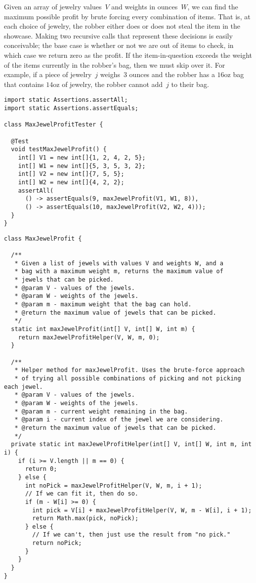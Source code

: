 Given an array of jewelry values~$V$ and weights in ounces~$W$, we can find the maximum possible profit by brute forcing every combination of items. 
That is, at each choice of jewelry, the robber either does or does not steal the item in the showcase. 
Making two recursive calls that represent these decisions is easily conceivable; 
the base case is whether or not we are out of items to check, in which case we return zero as the profit. 
If the item-in-question exceeds the weight of the items currently in the robber's bag, then we must skip over it. 
For example, if a piece of jewelry~$j$ weighs~$3$ ounces and the robber has a $16\text{oz}$ bag that contains $14\text{oz}$ of jewelry, the robber cannot add~$j$ to their bag.

\begin{lstlisting}[language=MyJava]
import static Assertions.assertAll;
import static Assertions.assertEquals;

class MaxJewelProfitTester {

  @Test
  void testMaxJewelProfit() {
    int[] V1 = new int[]{1, 2, 4, 2, 5};
    int[] W1 = new int[]{5, 3, 5, 3, 2};
    int[] V2 = new int[]{7, 5, 5};
    int[] W2 = new int[]{4, 2, 2};
    assertAll(
      () -> assertEquals(9, maxJewelProfit(V1, W1, 8)),
      () -> assertEquals(10, maxJewelProfit(V2, W2, 4)));
  }
}
\end{lstlisting}

\enlargethispage{-2\baselineskip}
\begin{lstlisting}[language=MyJava]
class MaxJewelProfit {

  /**
   * Given a list of jewels with values V and weights W, and a 
   * bag with a maximum weight m, returns the maximum value of 
   * jewels that can be picked.
   * @param V - values of the jewels.
   * @param W - weights of the jewels.
   * @param m - maximum weight that the bag can hold.
   * @return the maximum value of jewels that can be picked.
   */
  static int maxJewelProfit(int[] V, int[] W, int m) {
    return maxJewelProfitHelper(V, W, m, 0);
  }

  /**
   * Helper method for maxJewelProfit. Uses the brute-force approach 
   * of trying all possible combinations of picking and not picking each jewel.
   * @param V - values of the jewels.
   * @param W - weights of the jewels.
   * @param m - current weight remaining in the bag.
   * @param i - current index of the jewel we are considering.
   * @return the maximum value of jewels that can be picked.
   */
  private static int maxJewelProfitHelper(int[] V, int[] W, int m, int i) {
    if (i >= V.length || m == 0) {
      return 0;
    } else {
      int noPick = maxJewelProfitHelper(V, W, m, i + 1);
      // If we can fit it, then do so.
      if (m - W[i] >= 0) {
        int pick = V[i] + maxJewelProfitHelper(V, W, m - W[i], i + 1);
        return Math.max(pick, noPick);
      } else {
        // If we can't, then just use the result from "no pick."
        return noPick;
      }
    }
  }
}
\end{lstlisting}

